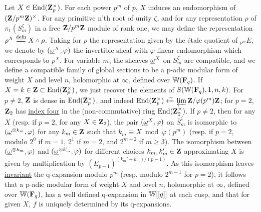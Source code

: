  Let $X\in\operatorname{End}(\mathbf{Z}_p^\times)$. For each power $p^m$ of $p$, $X$
induces an endomorphism of $(\mathbf{Z}/p^m\mathbf{Z})^\times$. For any primitive n'th root of
unity $\zeta$, and for any representation $\rho$ of $\pi_1(S_m^\zeta)$ in a free
$\mathbf{Z}/p^m\mathbf{Z}$ module of rank one, we may define the representation
$\rho^X\xlongequal{\text{defn}}X\circ\rho$. Taking for $\rho$ the representation
given by the \'etale quotient of ${}_{p^m}E$, we denote by $(\underline{\omega}^X,\varphi)$ the
invertible sheaf with $\varphi$-linear endomorphism which corresponds to
$\rho^X$. For variable $m$, the sheaves $\underline{\omega}^X$ on $S_m^\zeta$ are compatible,
and we define a compatible family of global sections to be a p-adic modular form
of weight $X$ and level $n$, holomorphic at $\infty$, defined over $\mathbb{W}(\mathbf{F}_q)$.
If $X=k\in\mathbf{Z}\subset\operatorname{End}(\mathbf{Z}_p^\times)$, we just recover the elements of
$S(\mathbb{W}(\mathbf{F}_q),1,n,k)$. For $p\neq 2$, $\mathbf{Z}$ is dense in $\operatorname{End}(\mathbf{Z}_p^\times)$, and
indeed $\operatorname{End}(\mathbf{Z}_p^\times)\xleftarrow{\sim}\varprojlim\mathbf{Z}/\varphi(p^m)\mathbf{Z}$; for
$p=2$, $\mathbf{Z}_2$ has \uline{index four} in the (non-commutative) ring
$\operatorname{End}(\mathbf{Z}_2^\times)$. If $p\neq 2$, then for any $X$ (resp. if $p=2$, for any
$X\in\mathbf{Z}_2$), the pair $(\underline{\omega}^X,\varphi)$ on $\overline{S}_m^\zeta$ is isomorphic
to $(\underline{\omega}^{\otimes k_m},\varphi)$ for any $k_m\in\mathbf{Z}$ such that
$k_m\equiv X \bmod \varphi(p^m)$ (resp. if $p=2$, modulo $2^0$ if $m=1$, $2^1$
if $m=2$, and $2^{m-2}$ if $m\geq 3$). The isomorphism between
$(\underline{\omega}^{\otimes k_m},\varphi)$ and $(\underline{\omega}^{\otimes k_m'},\varphi)$ for different
choices $k_m,k_m'\in\mathbf{Z}$ approximating $X$ is given by multiplication by
$(E_{p-1})^{(k_m'-k_m)/(p-1)}$. As this isomorphism leaves \uline{invariant} the
q-expansion modulo $p^m$ (resp. modulo $2^{m-1}$ for $p=2$), it follows that a
p-adic modular form of weight $X$ and level $n$, holomorphic at $\infty$, defined
over $\mathbb{W}(\mathbf{F}_q)$, has a well defined q-expansion in $\mathbb{W}[[q]]$ at each cusp, and
that for given $X$, $f$ is uniquely determined by its q-expansions.

